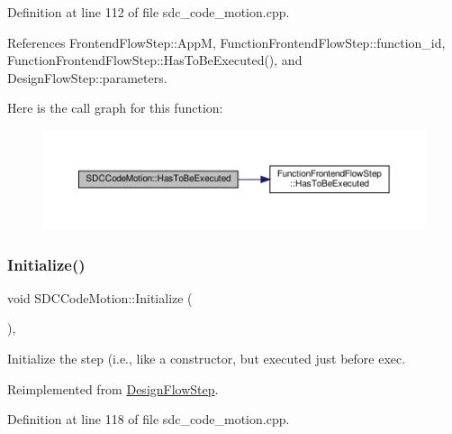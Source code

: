 Definition at line 112 of file sdc\+\_\+code\+\_\+motion.\+cpp.



References Frontend\+Flow\+Step\+::\+AppM, Function\+Frontend\+Flow\+Step\+::function\+\_\+id, Function\+Frontend\+Flow\+Step\+::\+Has\+To\+Be\+Executed(), and Design\+Flow\+Step\+::parameters.

Here is the call graph for this function\+:
\nopagebreak
\begin{figure}[H]
\begin{center}
\leavevmode
\includegraphics[width=350pt]{d3/de8/classSDCCodeMotion_ae41623316514debbca9be2eed971fa09_cgraph}
\end{center}
\end{figure}
\mbox{\label{classSDCCodeMotion_aa39c97469f1bafdb251a547487414aeb}} 
\subsubsection{\texorpdfstring{Initialize()}{Initialize()}}
{\footnotesize\ttfamily void S\+D\+C\+Code\+Motion\+::\+Initialize (\begin{DoxyParamCaption}{ }\end{DoxyParamCaption})\hspace{0.3cm}{\ttfamily [override]}, {\ttfamily [virtual]}}



Initialize the step (i.\+e., like a constructor, but executed just before exec. 



Reimplemented from \hyperlink{classDesignFlowStep_a44b50683382a094976e1d432a7784799}{Design\+Flow\+Step}.



Definition at line 118 of file sdc\+\_\+code\+\_\+motion.\+cpp.

\mbox{\label{classSDCCodeMotion_aa91dfc60f86626dbb167839a277a201e}} 
